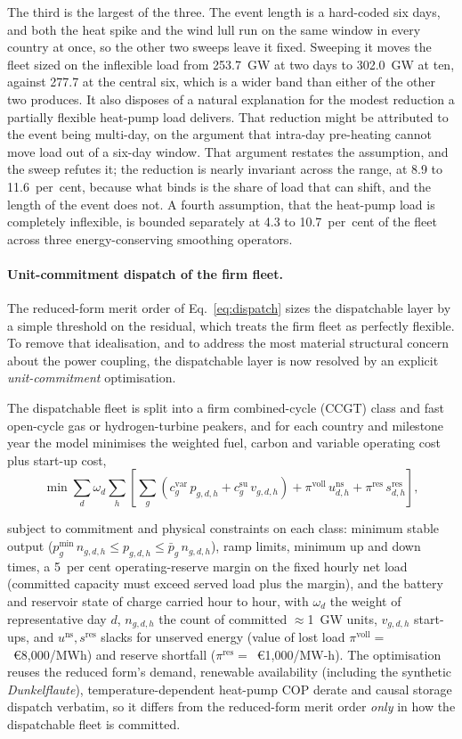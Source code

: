 The third is the largest of the three. The event length is a
hard-coded six days, and both the heat spike and the wind lull run on the same window in
every country at once, so the other two sweeps leave it fixed. Sweeping it moves the
fleet sized on the inflexible load from 253.7~GW at two days to 302.0~GW at ten, against 277.7 at the
central six, which is a wider band than either of the other two produces. It also
disposes of a natural explanation for the modest reduction a partially
flexible heat-pump load delivers. That reduction might be attributed to the event being
multi-day, on the
argument that intra-day pre-heating cannot move load out of a six-day window. That argument restates the assumption, and the sweep refutes it; the
reduction is nearly invariant across the range, at 8.9 to 11.6~per~cent, because what binds is the share of load that can shift, and the length of the event does not. A fourth
assumption, that the heat-pump load is completely inflexible, is bounded separately at
4.3 to 10.7~per~cent of the fleet across three energy-conserving smoothing operators.

\paragraph{Unit-commitment dispatch of the firm fleet.} The reduced-form merit order of
Eq.~\eqref{eq:dispatch} sizes the dispatchable layer by a simple threshold on the
residual, which treats the firm fleet as perfectly flexible. To remove that
idealisation, and to address the most material structural concern about the power
coupling, the dispatchable layer is now resolved by an explicit \emph{unit-commitment}
optimisation.

The dispatchable fleet is split into a firm combined-cycle (CCGT) class and fast
open-cycle gas or hydrogen-turbine peakers, and for each country and milestone year the
model minimises the weighted fuel, carbon and variable operating cost plus start-up
cost, \[ \min
\sum_{d}\omega_d\sum_{h}\left[\sum_{g}\left(c^{\mathrm{var}}_{g}\,p_{g,d,h} +
c^{\mathrm{su}}_{g}\,v_{g,d,h}\right) + \pi^{\mathrm{voll}}\,u^{\mathrm{ns}}_{d,h} +
\pi^{\mathrm{res}}\,s^{\mathrm{res}}_{d,h}\right], \]

subject to commitment and physical
constraints on each class: minimum stable output ($p^{\min}_{g}\,n_{g,d,h}\le
p_{g,d,h}\le \bar p_{g}\,n_{g,d,h}$), ramp limits, minimum up and down times, a 5~per
cent operating-reserve margin on the fixed hourly net load (committed capacity must
exceed served load plus the margin), and the battery and reservoir state of charge
carried hour to hour, with $\omega_d$ the weight of representative day $d$, $n_{g,d,h}$
the count of committed $\approx$1~GW units, $v_{g,d,h}$ start-ups, and
$u^{\mathrm{ns}},s^{\mathrm{res}}$ slacks for unserved energy (value of lost load
$\pi^{\mathrm{voll}}=$~\euro{}8{,}000/MWh) and reserve shortfall
($\pi^{\mathrm{res}}=$~\euro{}1{,}000/MW-h). The optimisation reuses the reduced form's
demand, renewable availability (including the synthetic \emph{Dunkelflaute}),
temperature-dependent heat-pump COP derate and causal storage dispatch verbatim, so it
differs from the reduced-form merit order \emph{only} in how the dispatchable fleet
is committed.


